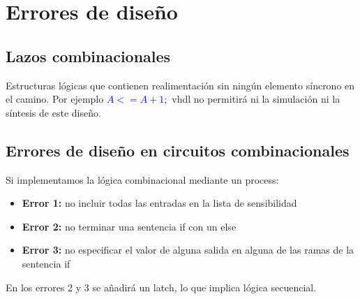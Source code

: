 \section{Errores de diseño}
\subsection{Lazos combinacionales}
Estructuras lógicas que contienen realimentación sin ningún elemento síncrono en el camino. Por ejemplo \textcolor{blue}{$A <= A + 1;$} \gls{vhdl} no permitirá ni la simulación ni la síntesis de este diseño.
\subsection{Errores de diseño en circuitos combinacionales}
Si implementamos la lógica combinacional mediante un process:
\begin{itemize}
	\item\textbf{Error 1:} no incluir todas las entradas en la lista de sensibilidad
	\item\textbf{Error 2:} no terminar una sentencia if con un else
	\item\textbf{Error 3:} no especificar el valor de alguna salida en alguna de las ramas de la sentencia if
\end{itemize}

En los errores 2 y 3 se añadirá un latch, lo que implica lógica secuencial.
